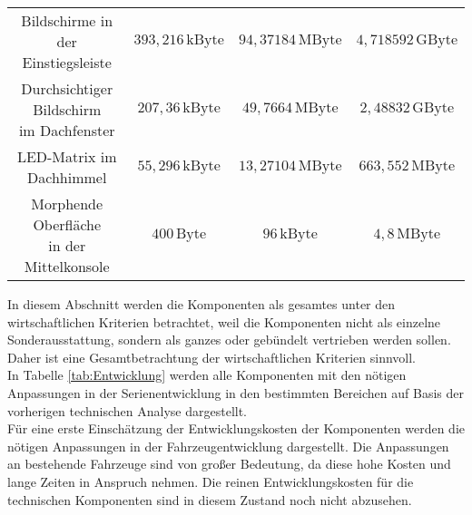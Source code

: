 \begin{table}[hbt]
\begin{tabular}{c|ccc}
		\parbox[t]{0.3\linewidth}{\centering Bildschirme in der Einstiegsleiste} & $ 393,216\,\mathrm{kByte} $ & $ 94,37184\,\mathrm{MByte} $ & $ 4,718592\,\mathrm{GByte} $ \\
		\parbox[t]{0.3\linewidth}{\centering Durchsichtiger Bildschirm\\im Dachfenster} & $ 207,36\,\mathrm{kByte} $ & $ 49,7664\,\mathrm{MByte} $ & $ 2,48832\,\mathrm{GByte} $ \\
		\parbox[t]{0.3\linewidth}{\centering LED-Matrix im Dachhimmel} & $ 55,296\,\mathrm{kByte} $ & $ 13,27104\,\mathrm{MByte} $ & $ 663,552\,\mathrm{MByte} $ \\
		\parbox[t]{0.3\linewidth}{\centering Morphende Oberfläche\\in der Mittelkonsole} & $ 400\,\mathrm{Byte} $ & $ 96\,\mathrm{kByte} $ &$ 4,8\,\mathrm{MByte} $ \\
	\end{tabular} 
\end{table}
In diesem Abschnitt werden die Komponenten als gesamtes unter den wirtschaftlichen Kriterien betrachtet, weil die Komponenten nicht als einzelne Sonderausstattung, sondern als ganzes oder gebündelt vertrieben werden sollen. Daher ist eine Gesamtbetrachtung der wirtschaftlichen Kriterien sinnvoll. \\
In Tabelle \ref{tab:Entwicklung} werden alle Komponenten mit den nötigen Anpassungen in der Serienentwicklung in den bestimmten Bereichen auf Basis der vorherigen technischen Analyse dargestellt. \\
Für eine erste Einschätzung der Entwicklungskosten der Komponenten werden die nötigen Anpassungen in der Fahrzeugentwicklung dargestellt. Die Anpassungen an bestehende Fahrzeuge sind von großer Bedeutung, da diese hohe Kosten und lange Zeiten in Anspruch nehmen. Die reinen Entwicklungskosten für die technischen Komponenten sind in diesem Zustand noch nicht abzusehen.
